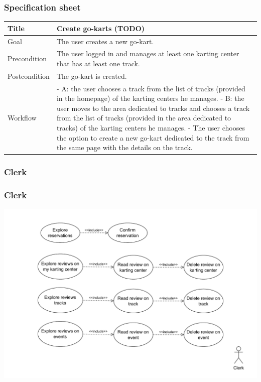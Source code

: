 \documentclass{beamer}
\begin{document}
\begin{frame}
    \frametitle{Specification sheet}
    \begin{table}
        \tiny
        \begin{tabular}{|p{2cm}|p{6cm}|}
        \hline  
        Title & \textbf{Create go-karts (TODO)} \\
        \hline
        Goal & The user creates a new go-kart. \\
        \hline
        Precondition & The user logged in and manages at least one karting center that has at least
        one track. \\
        \hline
        Postcondition & The go-kart is created. \\
        \hline
        Workflow &
        - A: the user chooses a track from the list of tracks (provided in the homepage)
        of the karting centers
        he manages. \newline
        - B: the user moves to the area dedicated to tracks and chooses a track from the list of tracks
        (provided in the area dedicated to tracks) of the karting centers he manages. \newline
        - The user chooses the option to create a new go-kart dedicated to the track 
        from the same page with the details on the track. \\
        \hline
        \end{tabular}
\end{table}
\end{frame}

\subsubsection*{Clerk}

\begin{frame}
    \frametitle{Clerk}
    \centering
    \includegraphics[width=0.9\linewidth]{drawio/clerk.pdf}
\end{frame}
\end{document}
